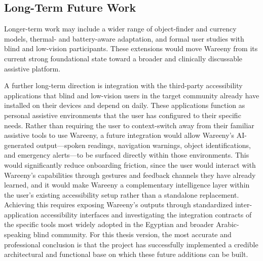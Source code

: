 \documentclass[a4paper]{report}
\begin{document}
\subsection{Long-Term Future Work}
Longer-term work may include a wider range of object-finder and currency models, thermal- and battery-aware adaptation, and formal user studies with blind and low-vision participants. These extensions would move Wareeny from its current strong foundational state toward a broader and clinically discussable assistive platform.

A further long-term direction is integration with the third-party accessibility applications that blind and low-vision users in the target community already have installed on their devices and depend on daily. These applications function as personal assistive environments that the user has configured to their specific needs. Rather than requiring the user to context-switch away from their familiar assistive tools to use Wareeny, a future integration would allow Wareeny's AI-generated output---spoken readings, navigation warnings, object identifications, and emergency alerts---to be surfaced directly within those environments. This would significantly reduce onboarding friction, since the user would interact with Wareeny's capabilities through gestures and feedback channels they have already learned, and it would make Wareeny a complementary intelligence layer within the user's existing accessibility setup rather than a standalone replacement. Achieving this requires exposing Wareeny's outputs through standardized inter-application accessibility interfaces and investigating the integration contracts of the specific tools most widely adopted in the Egyptian and broader Arabic-speaking blind community. For this thesis version, the most accurate and professional conclusion is that the project has successfully implemented a credible architectural and functional base on which these future additions can be built.
\end{document}
